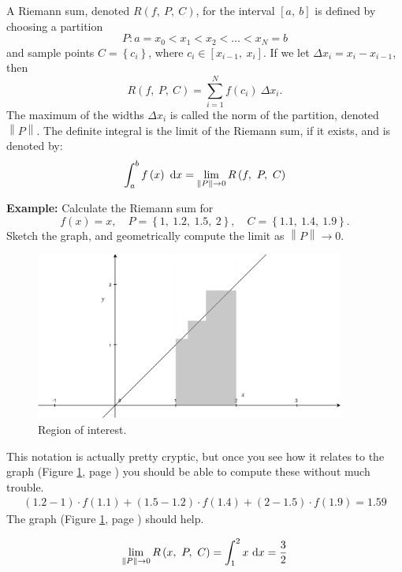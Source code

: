 \documentclass[12pt,addpoints, answers, fleqn]{exam}
\begin{document}
A Riemann sum, denoted $R\left( f, \ P, \ C \right)$, for the interval $\left[ a, \ b \right]$ is defined by choosing a partition
\[
P:a=x_0<x_1<x_2< \dots < x_N =b
\]
and sample points $C=\left\{ c_i \right\}$, where $c_i \in \left[ x_{i-1}, \ x_i \right]$. If we let $\Delta x_i = x_i - x_{i-1}$, then
\[
R\left( f, \ P, \ C \right) = \sum_{i=1}^N f \left(c_i\right) \ \Delta x_i.
\]
The maximum of the widths $\Delta x_i$ is called the norm of the partition, denoted $\left\| P \right\|$. The definite integral is the limit of the Riemann sum, if it exists, and is denoted by:
\[
\int_a^b f\left( x \right) \ {\rm{d}}x = \lim_{\left\| P \right\| \to 0} R\left( f, \ P, \ C \right)
\]



\textbf{Example:} Calculate the Riemann sum for
\[
f\left( x \right) = x, \quad P = \left\{ 1, \ 1.2, \ 1.5, \ 2 \right\}, \quad  C = \left\{ 1.1, \ 1.4, \ 1.9 \right\}.
\]
Sketch the graph, and geometrically compute the limit as $\left\| P \right\| \to 0$.

\begin{figure}[htbp] %
   \centering
   \includegraphics[width=4in]{./graphics/sa02.pdf} 
   \caption{Region of interest.}
   \label{fig:sa02}
\end{figure}

\begin{solution}
This notation is actually pretty cryptic, but once you see how it relates to the graph (Figure \ref{fig:sa02}, page \pageref{fig:sa02}) you should be able to compute these without much trouble.
\begin{eqnarray*}
\left( 1.2 - 1 \right) \cdot f \left( 1.1\right) + \left(1.5-1.2 \right) \cdot f \left(1.4 \right) + \left(2-1.5 \right) \cdot f \left(1.9 \right) = 1.59
\end{eqnarray*}
The graph (Figure \ref{fig:sa02}, page \pageref{fig:sa02}) should help.

\[
\lim_{\left\| P \right\| \to 0} R\left( x, \ P, \ C \right) = \int_1^2 x \ {\rm{d}}x = \frac{3}{2}
\]
\end{solution}
\end{document}
